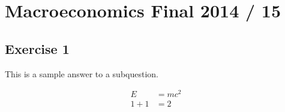 \section{Macroeconomics Final 2014 / 15}

{
\subsection*{Exercise 1}

\begin{enumerate}[label=(\alph*)]
{\item 
This is a sample answer to a subquestion.

\begin{align*}
    E &= mc^2 \\
    1 + 1 &= 2
\end{align*}
}
\end{enumerate}
}
